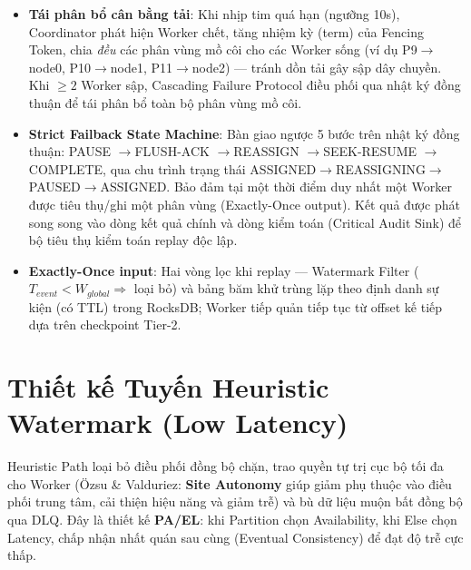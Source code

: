 \documentclass[9pt,a4paper]{article}
\begin{document}
\begin{itemize}[leftmargin=*]
    \item \textbf{Tái phân bổ cân bằng tải}: Khi nhịp tim quá hạn (ngưỡng 10s), Coordinator phát hiện Worker chết, tăng nhiệm kỳ (term) của Fencing Token, chia \emph{đều} các phân vùng mồ côi cho các Worker sống (ví dụ P9$\to$node0, P10$\to$node1, P11$\to$node2) --- tránh dồn tải gây sập dây chuyền. Khi $\ge 2$ Worker sập, Cascading Failure Protocol điều phối qua nhật ký đồng thuận để tái phân bổ toàn bộ phân vùng mồ côi.
    \item \textbf{Strict Failback State Machine}: Bàn giao ngược 5 bước trên nhật ký đồng thuận: PAUSE $\to$\allowbreak FLUSH-ACK $\to$\allowbreak REASSIGN $\to$\allowbreak SEEK-RESUME $\to$\allowbreak COMPLETE, qua chu trình trạng thái ASSIGNED$\to$\allowbreak REASSIGNING$\to$\allowbreak PAUSED$\to$\allowbreak ASSIGNED. Bảo đảm tại một thời điểm duy nhất một Worker được tiêu thụ/ghi một phân vùng (Exactly-Once output). Kết quả được phát song song vào dòng kết quả chính và dòng kiểm toán (Critical Audit Sink) để bộ tiêu thụ kiểm toán replay độc lập.
    \item \textbf{Exactly-Once input}: Hai vòng lọc khi replay --- Watermark Filter ($T_{event}<W_{global}\Rightarrow$ loại bỏ) và bảng băm khử trùng lặp theo định danh sự kiện (có TTL) trong RocksDB; Worker tiếp quản tiếp tục từ offset kế tiếp dựa trên checkpoint Tier-2.
\end{itemize}

\section{Thiết kế Tuyến Heuristic Watermark (Low Latency)}
Heuristic Path loại bỏ điều phối đồng bộ chặn, trao quyền tự trị cục bộ tối đa cho Worker (Özsu \& Valduriez: \textbf{Site Autonomy} giúp giảm phụ thuộc vào điều phối trung tâm, cải thiện hiệu năng và giảm trễ) và bù dữ liệu muộn bất đồng bộ qua DLQ. Đây là thiết kế \textbf{PA/EL}: khi Partition chọn Availability, khi Else chọn Latency, chấp nhận nhất quán sau cùng (Eventual Consistency) để đạt độ trễ cực thấp.
\end{document}
